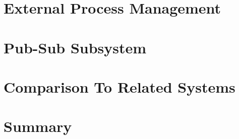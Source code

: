 \section{External Process Management}



\section{Pub-Sub Subsystem}
%






\section{Comparison To Related Systems}


\section{Summary}














